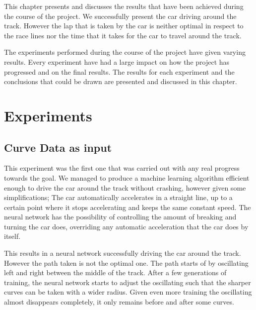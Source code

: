 This chapter presents and discusses the results that have been achieved during the course of the project. We successfully present the car driving around the track. However the lap that is taken by the car is neither optimal in respect to the race lines nor the time that it takes for the car to travel around the track.

The experiments performed during the course of the project have given varying results. Every experiment have had a large impact on how the project has progressed and on the final results. The results for each experiment and the conclusions that could be drawn are presented and discussed in this chapter.

\section{Experiments}

\subsection{Curve Data as input}
This experiment was the first one that was carried out with any real progress towards the goal. We managed to produce a machine learning algorithm efficient enough to drive the car around the track without crashing, however given some simplifications; The car automatically accelerates in a straight line, up to a certain point where it stops accelerating and keeps the same constant speed. The neural network has the possibility of controlling the amount of breaking and turning the car does, overriding any automatic acceleration that the car does by itself.

This results in a neural network successfully driving the car around the track. However the path taken is not the optimal one. The path starts of by oscillating left and right between the middle of the track. After a few generations of training, the neural network starts to adjust the oscillating such that the sharper curves can be taken with a wider radius. Given even more training the oscillating almost disappears completely, it only remains before and after some curves.

